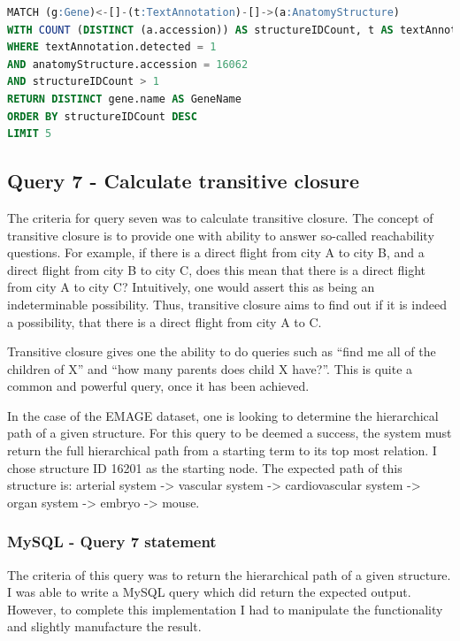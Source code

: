 \begin{lstlisting}[language=SQL, caption=Neo4j query 6 statement. Which Genes are most commonly co-expressed?., label=code:neoquery6]
MATCH (g:Gene)<-[]-(t:TextAnnotation)-[]->(a:AnatomyStructure)
WITH COUNT (DISTINCT (a.accession)) AS structureIDCount, t AS textAnnotation, a AS anatomyStructure, g AS gene
WHERE textAnnotation.detected = 1
AND anatomyStructure.accession = 16062
AND structureIDCount > 1
RETURN DISTINCT gene.name AS GeneName
ORDER BY structureIDCount DESC
LIMIT 5
\end{lstlisting}


\subsection*{Query 7 - Calculate transitive closure}\label{query7}
The criteria for query seven was to calculate transitive closure. The concept of transitive closure is to provide one with ability to answer so-called reachability questions. For example, if there is a direct flight from city A to city B, and a direct flight from city B to city C, does this mean that there is a direct flight from city A to city C? Intuitively, one would assert this as being an indeterminable possibility. Thus, transitive closure aims to find out if it is indeed a possibility, that there is a direct flight from city A to C.

Transitive closure gives one the ability to do queries such as ``find me all of the children of X'' and ``how many parents does child X have?''. This is quite a common and powerful query, once it has been achieved.

In the case of the EMAGE dataset, one is looking to determine the hierarchical path of a given structure. For this query to be deemed a success, the system must return the full hierarchical path from a starting term to its top most relation. I chose structure ID 16201 as the starting node. The expected path of this structure is: arterial system -> vascular system -> cardiovascular system -> organ system -> embryo -> mouse.

\subsubsection*{MySQL - Query 7 statement}\label{mysqlquery7statement}
The criteria of this query was to return the hierarchical path of a given structure. I was able to write a MySQL query which did return the expected output. However, to complete this implementation I had to manipulate the functionality and slightly manufacture the result.

